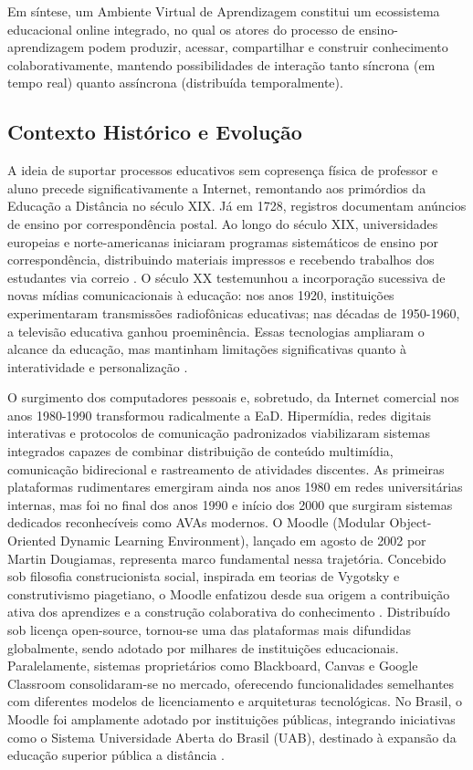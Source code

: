 \documentclass[portuguese]{sbc2025}%
\begin{document}
Em síntese, um Ambiente Virtual de Aprendizagem constitui um ecossistema educacional online integrado, no qual os atores do processo de ensino-aprendizagem podem produzir, acessar, compartilhar e construir conhecimento colaborativamente, mantendo possibilidades de interação tanto síncrona (em tempo real) quanto assíncrona (distribuída temporalmente).

\subsection{Contexto Histórico e Evolução}

A ideia de suportar processos educativos sem copresença física de professor e aluno precede significativamente a Internet, remontando aos primórdios da Educação a Distância no século XIX. Já em 1728, registros documentam anúncios de ensino por correspondência postal. Ao longo do século XIX, universidades europeias e norte-americanas iniciaram programas sistemáticos de ensino por correspondência, distribuindo materiais impressos e recebendo trabalhos dos estudantes via correio \cite{Moore1989}. O século XX testemunhou a incorporação sucessiva de novas mídias comunicacionais à educação: nos anos 1920, instituições experimentaram transmissões radiofônicas educativas; nas décadas de 1950-1960, a televisão educativa ganhou proeminência. Essas tecnologias ampliaram o alcance da educação, mas mantinham limitações significativas quanto à interatividade e personalização \cite{Garrison2016}.

O surgimento dos computadores pessoais e, sobretudo, da Internet comercial nos anos 1980-1990 transformou radicalmente a EaD. Hipermídia, redes digitais interativas e protocolos de comunicação padronizados viabilizaram sistemas integrados capazes de combinar distribuição de conteúdo multimídia, comunicação bidirecional e rastreamento de atividades discentes. As primeiras plataformas rudimentares emergiram ainda nos anos 1980 em redes universitárias internas, mas foi no final dos anos 1990 e início dos 2000 que surgiram sistemas dedicados reconhecíveis como AVAs modernos. O Moodle (Modular Object-Oriented Dynamic Learning Environment), lançado em agosto de 2002 por Martin Dougiamas, representa marco fundamental nessa trajetória. Concebido sob filosofia construcionista social, inspirada em teorias de Vygotsky e construtivismo piagetiano, o Moodle enfatizou desde sua origem a contribuição ativa dos aprendizes e a construção colaborativa do conhecimento \cite{Dougiamas2003}. Distribuído sob licença open-source, tornou-se uma das plataformas mais difundidas globalmente, sendo adotado por milhares de instituições educacionais. Paralelamente, sistemas proprietários como Blackboard, Canvas e Google Classroom consolidaram-se no mercado, oferecendo funcionalidades semelhantes com diferentes modelos de licenciamento e arquiteturas tecnológicas. No Brasil, o Moodle foi amplamente adotado por instituições públicas, integrando iniciativas como o Sistema Universidade Aberta do Brasil (UAB), destinado à expansão da educação superior pública a distância \cite{Souza2023, Alves2009}.
\end{document}
